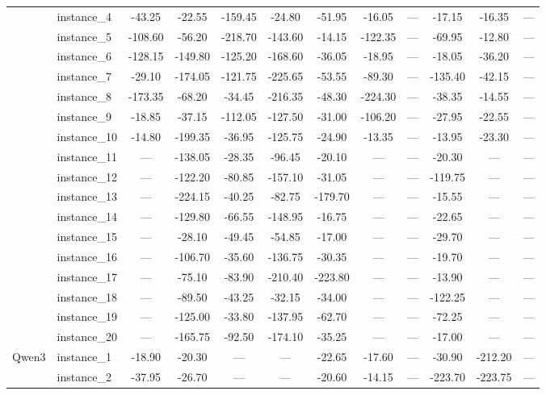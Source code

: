 \documentclass[sigconf]{acmart}
\begin{document}
\begin{table}[htbp]
\begin{tabular}{ll cccc ccc ccc}
 & instance\_4 & -43.25 & -22.55 & -159.45 & -24.80 & -51.95 & -16.05 & --- & -17.15 & -16.35 & --- \\
 & instance\_5 & -108.60 & -56.20 & -218.70 & -143.60 & -14.15 & -122.35 & --- & -69.95 & -12.80 & --- \\
 & instance\_6 & -128.15 & -149.80 & -125.20 & -168.60 & -36.05 & -18.95 & --- & -18.05 & -36.20 & --- \\
 & instance\_7 & -29.10 & -174.05 & -121.75 & -225.65 & -53.55 & -89.30 & --- & -135.40 & -42.15 & --- \\
 & instance\_8 & -173.35 & -68.20 & -34.45 & -216.35 & -48.30 & -224.30 & --- & -38.35 & -14.55 & --- \\
 & instance\_9 & -18.85 & -37.15 & -112.05 & -127.50 & -31.00 & -106.20 & --- & -27.95 & -22.55 & --- \\
 & instance\_10 & -14.80 & -199.35 & -36.95 & -125.75 & -24.90 & -13.35 & --- & -13.95 & -23.30 & --- \\
 & instance\_11 & --- & -138.05 & -28.35 & -96.45 & -20.10 & --- & --- & -20.30 & --- & --- \\
 & instance\_12 & --- & -122.20 & -80.85 & -157.10 & -31.05 & --- & --- & -119.75 & --- & --- \\
 & instance\_13 & --- & -224.15 & -40.25 & -82.75 & -179.70 & --- & --- & -15.55 & --- & --- \\
 & instance\_14 & --- & -129.80 & -66.55 & -148.95 & -16.75 & --- & --- & -22.65 & --- & --- \\
 & instance\_15 & --- & -28.10 & -49.45 & -54.85 & -17.00 & --- & --- & -29.70 & --- & --- \\
 & instance\_16 & --- & -106.70 & -35.60 & -136.75 & -30.35 & --- & --- & -19.70 & --- & --- \\
 & instance\_17 & --- & -75.10 & -83.90 & -210.40 & -223.80 & --- & --- & -13.90 & --- & --- \\
 & instance\_18 & --- & -89.50 & -43.25 & -32.15 & -34.00 & --- & --- & -122.25 & --- & --- \\
 & instance\_19 & --- & -125.00 & -33.80 & -137.95 & -62.70 & --- & --- & -72.25 & --- & --- \\
 & instance\_20 & --- & -165.75 & -92.50 & -174.10 & -35.25 & --- & --- & -17.00 & --- & --- \\
\midrule
Qwen3 & instance\_1 & -18.90 & -20.30 & --- & --- & -22.65 & -17.60 & --- & -30.90 & -212.20 & --- \\
 & instance\_2 & -37.95 & -26.70 & --- & --- & -20.60 & -14.15 & --- & -223.70 & -223.75 & --- \\

\end{tabular}
\end{table}
\end{document}
